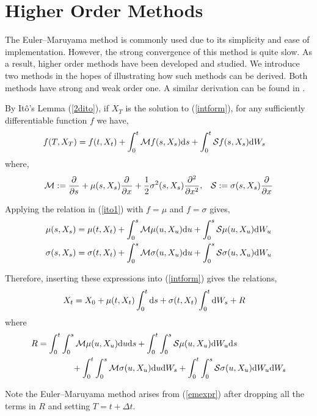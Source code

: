 \documentclass[12pt]{article}
\begin{document}
\section{Higher Order Methods}
The Euler--Maruyama method is commonly used due to its simplicity and ease of implementation. However, the strong convergence of this method is quite slow. As a result, higher order methods have been developed and studied. We introduce two methods in the hopes of illustrating how such methods can be derived. Both methods have strong and weak order one. A similar derivation can be found in \cite{holmes}.


By It\^o's Lemma (\ref{2dito}), if \( X_T \) is the solution to (\ref{intform}), for any sufficiently differentiable function \( f \) we have,
\begin{align}
    f(T,X_T) &= f(t,X_t) + \int_0^t \cM f(s,X_s)\d s + \int_0^t \cS f(s,X_s) \d W_s \label{ito1}
\end{align}
where,
\begin{align*}
    \cM := \pp{}{s} +  \mu(s,X_s)\pp{}{x} + \frac{1}{2}\sigma^2(s,X_s) \pp[2]{}{x}, && \cS := \sigma(s,X_s) \pp{}{x}
\end{align*}

Applying the relation in (\ref{ito1}) with \( f = \mu \) and \( f=\sigma \) gives,
\begin{align*}
    \mu(s,X_s) &= \mu(t,X_t) + \int_0^s \cM \mu(u,X_u) \d u + \int_0^s \cS \mu(u,X_u)\d W_u \\
    \sigma(s,X_s) &= \sigma(t,X_t) + \int_0^s \cM \sigma(u,X_u) \d u + \int_0^s \cS \sigma(u,X_u)\d W_u
\end{align*}

Therefore, inserting these expressions into (\ref{intform}) gives the relations,
\begin{align}
    X_t %
    &= X_0 + \mu(t,X_t) \int_0^t \d s +  \sigma(t,X_t)\int_0^t \d W_s + R \label{emexpr}
\end{align}
where
\begin{align}
    R &=  \int_0^t \int_0^s \cM \mu(u,X_u) \d u \d s + \int_0^t \int_0^s \cS \mu(u,X_u)\d W_u  \d s \tag*{}
    \\ &\hspace{4em} + \int_0^t \int_0^s \cM \sigma(u,X_u)\d u \d W_s + \int_0^t \int_0^s \cS \sigma(u,X_u) \d W_u \d W_s
\end{align}

Note the Euler--Maruyama method arises from (\ref{emexpr}) after dropping all the terms in \( R \) and setting \( T = t+\Delta t \).
\end{document}
